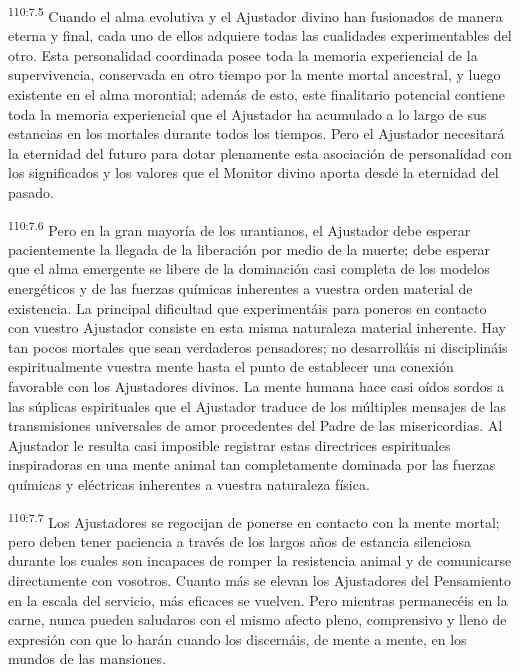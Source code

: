 \documentclass[twoside, 11pt]{book}
\begin{document}
\par
\textsuperscript{110:7.5} Cuando el alma evolutiva y el Ajustador divino han fusionados de manera eterna y final, cada uno de ellos adquiere todas las cualidades experimentables del otro. Esta personalidad coordinada posee toda la memoria experiencial de la supervivencia, conservada en otro tiempo por la mente mortal ancestral, y luego existente en el alma morontial; además de esto, este finalitario potencial contiene toda la memoria experiencial que el Ajustador ha acumulado a lo largo de sus estancias en los mortales durante todos los tiempos. Pero el Ajustador necesitará la eternidad del futuro para dotar plenamente esta asociación de personalidad con los significados y los valores que el Monitor divino aporta desde la eternidad del pasado.

\par
\textsuperscript{110:7.6} Pero en la gran mayoría de los urantianos, el Ajustador debe esperar pacientemente la llegada de la liberación por medio de la muerte; debe esperar que el alma emergente se libere de la dominación casi completa de los modelos energéticos y de las fuerzas químicas inherentes a vuestra orden material de existencia. La principal dificultad que experimentáis para poneros en contacto con vuestro Ajustador consiste en esta misma naturaleza material inherente. Hay tan pocos mortales que sean verdaderos pensadores; no desarrolláis ni disciplináis espiritualmente vuestra mente hasta el punto de establecer una conexión favorable con los Ajustadores divinos. La mente humana hace casi oídos sordos a las súplicas espirituales que el Ajustador traduce de los múltiples mensajes de las transmisiones universales de amor procedentes del Padre de las misericordias. Al Ajustador le resulta casi imposible registrar estas directrices espirituales inspiradoras en una mente animal tan completamente dominada por las fuerzas químicas y eléctricas inherentes a vuestra naturaleza física.

\par
\textsuperscript{110:7.7} Los Ajustadores se regocijan de ponerse en contacto con la mente mortal; pero deben tener paciencia a través de los largos años de estancia silenciosa durante los cuales son incapaces de romper la resistencia animal y de comunicarse directamente con vosotros. Cuanto más se elevan los Ajustadores del Pensamiento en la escala del servicio, más eficaces se vuelven. Pero mientras permanecéis en la carne, nunca pueden saludaros con el mismo afecto pleno, comprensivo y lleno de expresión con que lo harán cuando los discernáis, de mente a mente, en los mundos de las mansiones.
\end{document}
